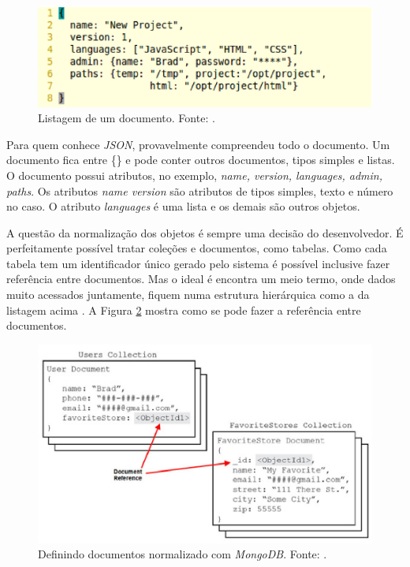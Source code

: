 \begin{figure}[H]
	\centering
	\includegraphics[width=12cm]{figuras/listagem1.eps}
	\caption{Listagem de um documento. Fonte: .}
	\label{listagem1}
\end{figure}


Para quem conhece \emph{JSON}, provavelmente compreendeu todo o documento. Um documento fica entre \{\} e pode conter outros documentos, tipos simples e listas.
O documento possui atributos, no exemplo, \emph{name, version, languages, admin, paths}. Os atributos \emph{name version} são atributos de tipos simples, texto e número no caso. O atributo \emph{languages} é uma lista e os demais são outros objetos.

A questão da normalização dos objetos é sempre uma decisão do desenvolvedor. É perfeitamente possível tratar coleções e documentos, como tabelas. Como cada tabela tem um identificador único gerado pelo sistema é possível inclusive fazer referência entre documentos. Mas o ideal é encontra um meio termo, onde dados muito acessados juntamente, fiquem numa estrutura hierárquica como a da listagem acima \cite{Dayley2014}. A Figura \ref{normalizacao} mostra como se pode fazer a referência entre documentos.

\begin{figure}[ht]
	\centering
	\includegraphics[width=12cm]{figuras/normalizacao.eps}
	\caption{Definindo documentos normalizado com \emph{MongoDB}. Fonte: .}
	\label{normalizacao}
\end{figure}
